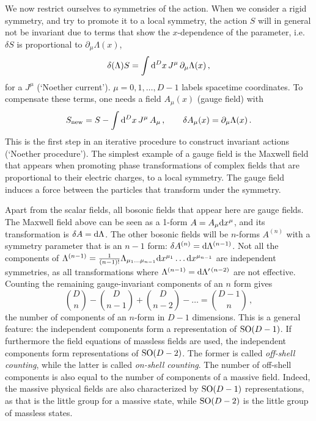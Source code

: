 \documentclass[a4paper,11pt,twoside]{article}
\def\rmd{{\rm d}}
\newcommand{\SO}{\mathop{\rm SO}}
\begin{document}
We now restrict ourselves to symmetries of the action. When we consider a
rigid symmetry, and try to promote it to a local symmetry, the action $S$
will in general not be invariant due to terms that show the
$x$-dependence of the parameter, i.e.\ $\delta S$ is proportional to
$\partial _\mu \Lambda (x)$,
\begin{equation}
  \delta (\Lambda ) S =\int \rmd^Dx\, J^\mu\,\partial _\mu \Lambda (x)\,,
 \label{delSJdLambda}
\end{equation}
for a $J^\mu $ (`Noether current'). $\mu=0,1,\ldots ,D-1$ labels
spacetime coordinates. To compensate these terms, one needs a field
$A_\mu (x)$ (gauge field) with
\begin{equation}
  S_{\rm new}= S - \int\rmd^Dx\, J^\mu\, A_\mu \,,\qquad
  \delta A_\mu(x) =\partial _\mu \Lambda (x)\,.
 \label{SwithA}
\end{equation}
This is the first step in an iterative procedure to construct invariant
actions (`Noether procedure'). The simplest example of a gauge field is
the Maxwell field that appears when promoting phase transformations of
complex fields that are proportional to their electric charges, to a
local symmetry. The gauge field induces a force between the particles
that transform under the symmetry.

Apart from the scalar fields, all bosonic fields that appear here are
gauge fields. The Maxwell field above can be seen as a 1-form $A=A_\mu
\rmd x^\mu $, and its transformation is $\delta A=\rmd \Lambda$. The
other bosonic fields will be $n$-forms $A^{(n)}$ with a symmetry
parameter that is an $n-1$ form: $\delta A^{(n)}=\rmd \Lambda^{(n-1)}$.
Not all the components of $\Lambda^{(n-1)}=\frac{1}{(n-1)!} \Lambda _{\mu
_1\ldots \mu _{n-1}}\rmd x^{\mu _1}\ldots \rmd x^{\mu _{n-1}}$ are
independent symmetries, as all transformations where
$\Lambda^{(n-1)}=\rmd \Lambda ^{\prime\,(n-2)}$ are not effective.
Counting the remaining gauge-invariant components of an $n$ form gives
\begin{equation}
  {D\choose n} - {D \choose n-1} + {D \choose n-2} - \ldots = {D-1\choose
  n}\,,
 \label{compnform}
\end{equation}
the number of components of an $n$-form in $D-1$ dimensions. This is a
general feature: the independent components form a representation of
$\SO(D-1)$. If furthermore the field equations of massless fields are
used, the independent components form representations of $\SO(D-2)$. The
former is called \emph{off-shell counting}, while the latter is called
\emph{on-shell counting}.  The number of off-shell components is also
equal to the number of components of a massive field. Indeed, the massive
physical fields are also characterized by $\SO(D-1)$ representations, as
that is the little group for a massive state, while $\SO(D-2)$ is the
little group of massless states.
\end{document}
